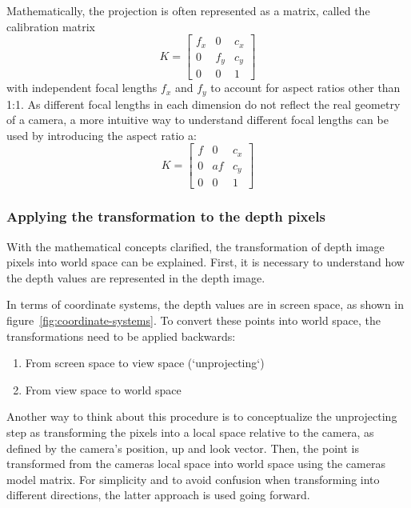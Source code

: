 Mathematically, the projection is often represented as a matrix, called the calibration matrix
\begin{equation}
    K = \begin{bmatrix}
            f_x & 0   & c_x \\
            0   & f_y & c_y \\
            0   & 0   & 1
    \end{bmatrix}
\end{equation}
with independent focal lengths $f_x$ and $f_y$ to account for aspect ratios other than 1:1.
As different focal lengths in each dimension do not reflect the real geometry of a camera,
a more intuitive way to understand different focal lengths can be used by introducing the aspect ratio a:
\begin{equation}
    K = \begin{bmatrix}
            f & 0  & c_x \\
            0 & af & c_y \\
            0 & 0  & 1
    \end{bmatrix}
\end{equation}
\parencite{szeliski_computer_2022}




\subsubsection{Applying the transformation to the depth pixels}
With the mathematical concepts clarified, the transformation of depth image pixels into world space can be explained.
First, it is necessary to understand how the depth values are represented in the depth image.

In terms of coordinate systems, the depth values are in screen space, as shown in figure~\ref{fig:coordinate-systems}.
To convert these points into world space, the transformations need to be applied backwards:
\begin{enumerate}
    \item From screen space to view space (`unprojecting`)
    \item From view space to world space
\end{enumerate}
Another way to think about this procedure is to conceptualize the unprojecting step as transforming the pixels into a local space
relative to the camera, as defined by the camera's position, up and look vector.
Then, the point is transformed from the cameras local space into world space using the cameras model matrix.
For simplicity and to avoid confusion when transforming into different directions, the latter approach is used going forward.

